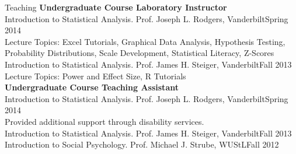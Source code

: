 \documentclass {resume}
\begin{document}
\begin{rSection}{\textrm{Teaching
}}
{\large {\bf Undergraduate Course Laboratory Instructor}\\}
Introduction to Statistical Analysis. Prof. Joseph L. Rodgers, Vanderbilt\hfill  {Spring 2014}\\
\hspace* {6 mm}Lecture Topics: Excel Tutorials, Graphical Data Analysis, Hypothesis Testing,\\
\hspace* {6 mm}Probability Distributions, Scale Development, Statistical Literacy, Z-Scores%
\smallskip\\
Introduction to Statistical Analysis. Prof. James H. Steiger, Vanderbilt\hfill  {Fall 2013}\\
\hspace* {6 mm}Lecture Topics: Power and Effect Size, R Tutorials\medskip\\
{\large {\bf Undergraduate Course Teaching Assistant}}\\
Introduction to Statistical Analysis. Prof. Joseph L. Rodgers, Vanderbilt\hfill  {Spring 2014}\\
{\footnotesize \hspace* {6 mm}Provided additional support through disability services.}\smallskip\\
Introduction to Statistical Analysis. Prof. James H. Steiger, Vanderbilt\hfill  {Fall 2013}\smallskip\\
Introduction to Social Psychology. Prof. Michael J. Strube, WUStL\hfill  {Fall 2012}
\end{rSection}
\end{document}
